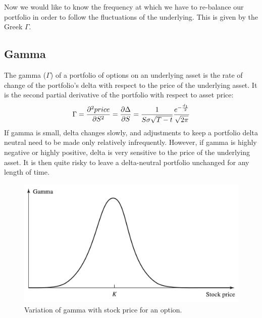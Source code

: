  Now we would like to know the frequency at which we have to re-balance our portfolio in order to follow the fluctuations of the underlying. This is given by the Greek $\Gamma$.

\subsection{Gamma} %
The gamma ($\Gamma$) of a portfolio of options on an underlying asset is the rate of change of the portfolio's delta with respect to the price of the underlying asset. It is the second partial derivative of the portfolio with respect to asset price:
\begin{equation}
    \Gamma = \pdv[2]{price}{S} = \pdv{\Delta}{S} = \dfrac{1}{S\sigma\sqrt{T-t}}\dfrac{e^{-\frac{d_1}{2}}}{\sqrt{2\pi}}
\end{equation}
If gamma is small, delta changes slowly, and adjustments to keep a portfolio delta neutral need to be made only relatively infrequently. However, if gamma is highly negative or highly positive, delta is very sensitive to the price of the underlying asset. It is then quite risky to leave a delta-neutral portfolio unchanged for any length of time.
\begin{figure}[htp]
    \centering
    \includegraphics[scale=0.2]{fig/tmp/fig14.png}
    \caption{Variation of gamma with stock price for an option.}
    \label{fig:gamma}
\end{figure}

